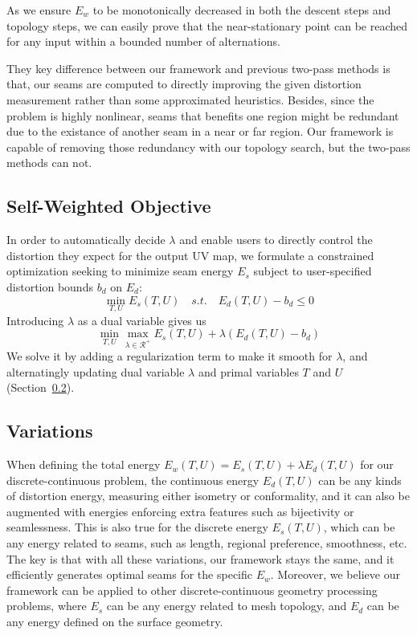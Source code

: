 As we ensure $E_w$ to be monotonically decreased in both the descent steps and topology steps, we can easily prove that the near-stationary point can be reached for any input within a bounded number of alternations.

They key difference between our framework and previous two-pass methods is that, our seams are computed to directly improving the given distortion measurement rather than some approximated heuristics. Besides, since the problem is highly nonlinear, seams that benefits one region might be redundant due to the existance of another seam in a near or far region. Our framework is capable of removing those redundancy with our topology search, but the two-pass methods can not.


\subsection{Self-Weighted Objective}

In order to automatically decide $\lambda$ and enable users to directly control the distortion they expect for the output UV map, we formulate a constrained optimization seeking to minimize seam energy $E_s$ subject to user-specified distortion bounds $b_d$ on $E_d$:
\[ \min_{T,U} E_s(T,U) \quad s.t. \quad E_d(T,U) - b_d \leq 0 \]
Introducing $\lambda$ as a dual variable gives us
\[ \min_{T,U} \max_{\lambda \in \mathcal{R^+}} E_s(T,U) + \lambda(E_d(T,U) - b_d) \]
We solve it by adding a regularization term to make it smooth for $\lambda$, and alternatingly updating dual variable $\lambda$ and primal variables $T$ and $U$ (Section~\ref{}). 
 
\subsection{Variations}

When defining the total energy $E_w(T,U) = E_s(T,U) + \lambda E_d(T,U)$ for our discrete-continuous problem, the continuous energy $E_d(T,U)$ can be any kinds of distortion energy, measuring either isometry or conformality, and it can also be augmented with energies enforcing extra features such as bijectivity or seamlessness. This is also true for the discrete energy $E_s(T,U)$, which can be any energy related to seams, such as length, regional preference, smoothness, etc. The key is that with all these variations, our framework stays the same, and it efficiently generates optimal seams for the specific $E_w$. Moreover, we believe our framework can be applied to other discrete-continuous geometry processing problems, where $E_s$ can be any energy related to mesh topology, and $E_d$ can be any energy defined on the surface geometry.

